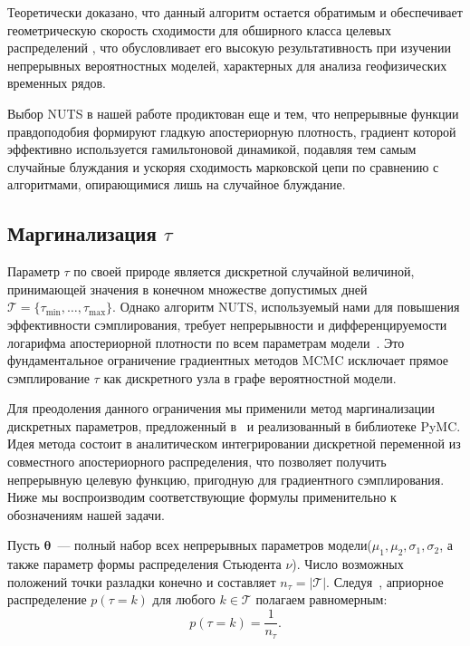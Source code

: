 \documentclass[14pt]{mmcs_article}
\begin{document}
Теоретически доказано, что данный алгоритм остается
обратимым и обеспечивает геометрическую скорость сходимости
для обширного класса целевых распределений
\cite{Durmus2023}, что обусловливает его высокую
результативность при изучении непрерывных вероятностных
моделей, характерных для анализа геофизических временных
рядов.

Выбор NUTS в нашей работе продиктован еще и тем, что
непрерывные функции правдоподобия формируют гладкую
апостериорную плотность, градиент которой эффективно
используется гамильтоновой динамикой, подавляя тем самым
случайные блуждания и ускоряя сходимость марковской цепи
по сравнению с алгоритмами, опирающимися лишь на случайное
блуждание.

\subsection*{Маргинализация \boldmath$\tau$}

Параметр $\tau$ по своей природе является дискретной случайной
величиной, принимающей значения в конечном множестве допустимых
дней $\mathcal{T} = \{\tau_{\min}, \dots, \tau_{\max}\}$. Однако
алгоритм NUTS, используемый нами для повышения эффективности
сэмплирования, требует непрерывности и дифференцируемости
логарифма апостериорной плотности по всем параметрам
модели~\cite{HoffmanGelman2014}. Это фундаментальное ограничение
градиентных методов MCMC исключает прямое сэмплирование $\tau$
как дискретного узла в графе вероятностной модели.

Для преодоления данного ограничения мы применили метод
маргинализации дискретных параметров, предложенный
в~\cite{lai2023automaticallymarginalizedmcmcprobabilistic} и
реализованный в библиотеке PyMC. Идея метода состоит в
аналитическом интегрировании дискретной переменной из
совместного апостериорного распределения, что позволяет
получить непрерывную целевую функцию, пригодную для
градиентного сэмплирования. Ниже мы воспроизводим
соответствующие формулы применительно к обозначениям нашей
задачи.

Пусть $\boldsymbol{\theta}$~--- полный набор всех непрерывных
параметров модели\linebreak ($\mu_1, \mu_2, \sigma_1, \sigma_2$, а также
параметр формы распределения Стьюдента $\nu$). Число возможных
положений точки разладки конечно и составляет
$n_{\tau} = |\mathcal{T}|$. Следуя~\cite{%
	lai2023automaticallymarginalizedmcmcprobabilistic}, априорное
распределение $p(\tau = k)$ для любого $k \in \mathcal{T}$
полагаем равномерным:
\begin{equation}\label{eq:tau_prior}
	p(\tau = k) = \frac{1}{n_{\tau}}.
\end{equation}
\end{document}
